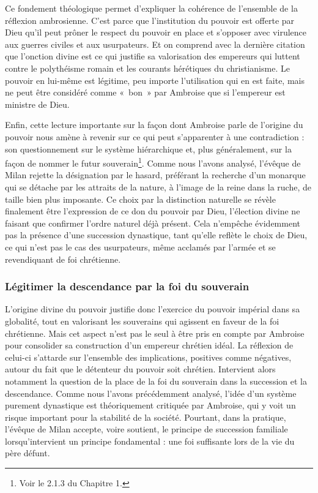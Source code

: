 \bigskip

Ce fondement théologique permet d'expliquer la cohérence de l'ensemble de la réflexion ambrosienne. C'est parce que l'institution du pouvoir est offerte par Dieu qu'il peut prôner le respect du pouvoir en place et s'opposer avec virulence aux guerres civiles et aux usurpateurs. Et on comprend avec la dernière citation que l'onction divine est ce qui justifie sa valorisation des empereurs qui luttent contre le polythéisme romain et les courants hérétiques du christianisme. Le pouvoir en lui-même est légitime, peu importe l'utilisation qui en est faite, mais ne peut être considéré comme «~bon~» par Ambroise que si l'empereur est ministre de Dieu.

\bigskip

Enfin, cette lecture importante sur la façon dont Ambroise parle de l'origine du pouvoir nous amène à revenir sur ce qui peut s'apparenter à une contradiction : son questionnement sur le système hiérarchique et, plus généralement, sur la façon de nommer le futur souverain\footnote{Voir le 2.1.3 du Chapitre 1.}. Comme nous l'avons analysé, l'évêque de Milan rejette la désignation par le hasard, préférant la recherche d'un monarque qui se détache par les attraits de la nature, à l'image de la reine dans la ruche, de taille bien plus imposante. Ce choix par la distinction naturelle se révèle finalement être l'expression de ce don du pouvoir par Dieu, l'élection divine ne faisant que confirmer l'ordre naturel déjà présent. Cela n'empêche évidemment pas la présence d'une succession dynastique, tant qu'elle reflète le choix de Dieu, ce qui n'est pas le cas des usurpateurs, même acclamés par l'armée et se revendiquant de foi chrétienne.

\bigskip

\subsubsection{Légitimer la descendance par la foi du souverain}

L'origine divine du pouvoir justifie donc l'exercice du pouvoir impérial dans sa globalité, tout en valorisant les souverains qui agissent en faveur de la foi chrétienne. Mais cet aspect n'est pas le seul à être pris en compte par Ambroise pour consolider sa construction d'un empereur chrétien idéal. La réflexion de celui-ci s'attarde sur l'ensemble des implications, positives comme négatives, autour du fait que le détenteur du pouvoir soit chrétien. Intervient alors notamment la question de la place de la foi du souverain dans la succession et la descendance. Comme nous l'avons précédemment analysé, l'idée d'un système purement dynastique est théoriquement critiquée par Ambroise, qui y voit un risque important pour la stabilité de la société. Pourtant, dans la pratique, l'évêque de Milan accepte, voire soutient, le principe de succession familiale lorsqu'intervient un principe fondamental : une foi suffisante lors de la vie du père défunt.

